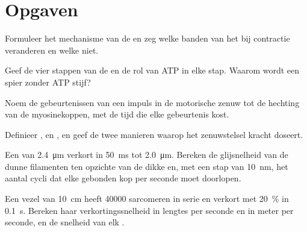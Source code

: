 \section{Opgaven}

\begin{exercise}[$\star$]\label{exo:b2:muscle-movement:1}
Formuleer het mechanisme van de  en zeg welke banden van
het  bij contractie veranderen en welke niet.
\end{exercise}

\begin{exercise}[$\star$]\label{exo:b2:muscle-movement:2}
Geef de vier stappen van de  en de rol van ATP in elke stap.
Waarom wordt een spier zonder ATP stijf?
\end{exercise}

\begin{exercise}[$\star$]\label{exo:b2:muscle-movement:3}
Noem de gebeurtenissen van een impuls in de motorische zenuw tot de hechting
van de myosinekoppen, met de tijd die elke gebeurtenis kost.
\end{exercise}

\begin{exercise}[$\star$]\label{exo:b2:muscle-movement:4}
Definieer ,  en , en geef de
twee manieren waarop het zenuwstelsel kracht doseert.
\end{exercise}

\begin{exercise}[$\star\star$]\label{exo:b2:muscle-movement:5}
Een  van \qty{2.4}{\micro m} verkort in \qty{50}{ms} tot
\qty{2.0}{\micro m}. Bereken de glijsnelheid van de dunne filamenten ten
opzichte van de dikke en, met een stap van \qty{10}{nm}, het aantal cycli dat
elke gebonden kop per seconde moet doorlopen.
\end{exercise}

\begin{exercise}[$\star\star$]\label{exo:b2:muscle-movement:6}
Een vezel van \qty{10}{cm} heeft \num{40000} sarcomeren in serie en verkort
met \qty{20}{\%} in \qty{0.1}{s}. Bereken haar verkortingssnelheid in lengtes
per seconde en in meter per seconde, en de snelheid van elk .
\end{exercise}

